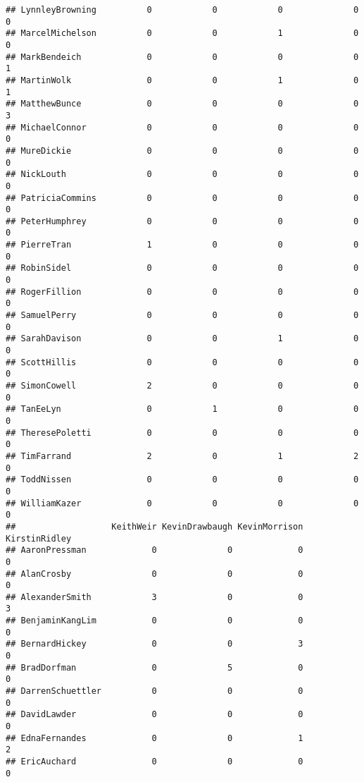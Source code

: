 \documentclass[
  12pt,
]{article}
\begin{document}
\begin{verbatim}
## LynnleyBrowning          0            0            0              0           0
## MarcelMichelson          0            0            1              0           0
## MarkBendeich             0            0            0              0           1
## MartinWolk               0            0            1              0           1
## MatthewBunce             0            0            0              0           3
## MichaelConnor            0            0            0              0           0
## MureDickie               0            0            0              0           0
## NickLouth                0            0            0              0           0
## PatriciaCommins          0            0            0              0           0
## PeterHumphrey            0            0            0              0           0
## PierreTran               1            0            0              0           0
## RobinSidel               0            0            0              0           0
## RogerFillion             0            0            0              0           0
## SamuelPerry              0            0            0              0           0
## SarahDavison             0            0            1              0           0
## ScottHillis              0            0            0              0           0
## SimonCowell              2            0            0              0           0
## TanEeLyn                 0            1            0              0           0
## TheresePoletti           0            0            0              0           0
## TimFarrand               2            0            1              2           0
## ToddNissen               0            0            0              0           0
## WilliamKazer             0            0            0              0           0
##                   KeithWeir KevinDrawbaugh KevinMorrison KirstinRidley
## AaronPressman             0              0             0             0
## AlanCrosby                0              0             0             0
## AlexanderSmith            3              0             0             3
## BenjaminKangLim           0              0             0             0
## BernardHickey             0              0             3             0
## BradDorfman               0              5             0             0
## DarrenSchuettler          0              0             0             0
## DavidLawder               0              0             0             0
## EdnaFernandes             0              0             1             2
## EricAuchard               0              0             0             0

\end{verbatim}
\end{document}
